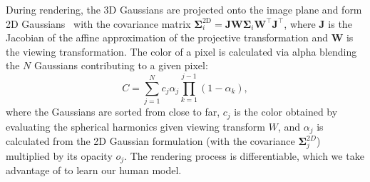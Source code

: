 During rendering, the 3D Gaussians are projected onto the image plane and form 2D Gaussians~\cite{zwicker2001surface} with the covariance matrix $\bm\Sigma_{i}^{\textrm{2D}} = \bm{J} \bm{W} \bm\Sigma_{i} \bm{W}^\top \bm{J}^\top$,
%
%
where $\bm{J}$ is the Jacobian of the affine approximation of the projective transformation and $\bm{W}$ is the viewing transformation. 
%
The color of a pixel is calculated via alpha blending the $N$ Gaussians contributing to a given pixel: 
%
\begin{equation}
    C = \sum_{j = 1}^{N} c_j \alpha_{j} \prod_{k=1}^{j-1} (1 - \alpha_{k}),
\end{equation}
%
where the Gaussians are sorted from close to far, $c_j$ is the color obtained by evaluating the spherical harmonics given viewing transform $W$, and $\alpha_j$ is calculated from the 2D Gaussian formulation (with the covariance $\bm\Sigma_{j}^{2D}$) multiplied by its opacity $o_j$.
%
The rendering process is differentiable, which we take advantage of to learn our human model.



